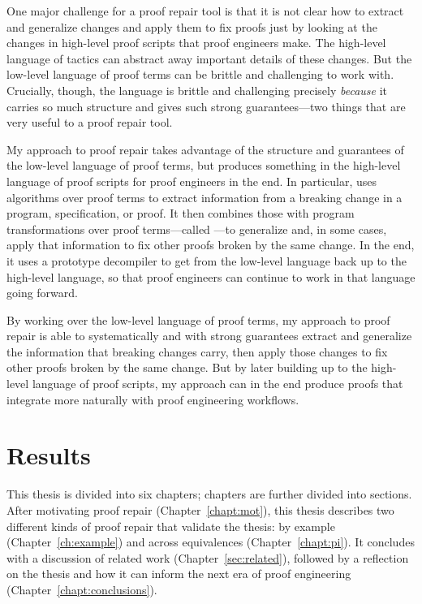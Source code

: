 One major challenge for a proof repair tool is that it is not clear how to extract and generalize changes and apply
them to fix proofs just by looking at the changes in high-level proof scripts that proof engineers make.
The high-level language of tactics can abstract away important details of these changes.
But the low-level language of proof terms can be brittle and challenging to work with.
Crucially, though, the language is brittle and challenging precisely \textit{because}
it carries so much structure and gives such strong guarantees---two things that are very useful to a proof repair tool.

My approach to proof repair takes advantage of the structure and guarantees of the low-level language of proof terms,
but produces something in the high-level language of proof scripts for proof engineers in the end.
In particular, uses  algorithms over proof terms
to extract information from a breaking change in a program, specification, or proof.
It then combines those with program transformations over proof terms---called ---to
generalize and, in some cases, apply that information to fix other  proofs broken by the same change.
In the end, it uses a prototype decompiler to get from the low-level language back up to the high-level language,
so that proof engineers can continue to work in that language going forward. %

By working over the low-level language of proof terms,
my approach to proof repair is able to systematically and with strong guarantees extract and generalize the information that breaking changes carry,
then apply those changes to fix other proofs broken by the same change.
But by later building up to the high-level language of proof scripts,
my approach can in the end produce proofs that integrate more naturally with proof engineering workflows.

\section{Results}
\label{sec:intro-results}

This thesis is divided into six chapters; chapters are further divided into sections.
After motivating proof repair (Chapter~\ref{chapt:mot}),
this thesis describes two different kinds of proof repair that validate the thesis:
by example (Chapter~\ref{ch:example}) and across equivalences (Chapter~\ref{chapt:pi}).
It concludes with a discussion of related work (Chapter~\ref{sec:related}),
followed by a reflection on the thesis and how it can inform the next era of 
proof engineering (Chapter~\ref{chapt:conclusions}).

